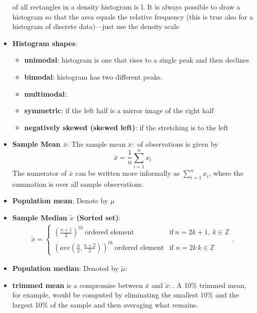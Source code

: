 \documentclass{report}
\begin{document}
\begin{itemize}
            of all rectangles in a density histogram is l. It is always possible to draw a histogram
            so that the area equals the relative frequency (this is true also for a histogram of discrete data)—just use the density scale
        \item \textbf{Histogram shapes}:
            \begin{itemize}
                \item \textbf{unimodal}: histogram is one that rises to a single peak and then declines
                \item \textbf{bimodal}: histogram has two different peaks.
                \item \textbf{multimodal}:.
                \item \textbf{symmetric}: if the left half is a mirror image of the right half
                \item \textbf{negatively skewed (skewed left)}: if the stretching is to the left
            \end{itemize}
        \item \textbf{Sample Mean $\bar{x}$}: The sample mean $\bar{x}:$ of observations is given by
            \[
                \bar{x} = \frac{1}{n} \sum_{i=1}^{n} x_i
            \]
            The numerator of \(\bar{x}\) can be written more informally as \(\sum_{i=1}^{n} x_i\), where the summation is over all sample observations.
        \item \textbf{Population mean}: Denote by $\mu$
        \item \textbf{Sample Median $\tilde{x}$ (Sorted set)}:
            \begin{align*}
                \tilde{x}=
                \begin{cases}
                    \left(\frac{n+1}{2}\right)^{th}\ \text{ordered element} &\text{if}\ n = 2k+1,\ k\in\mathbb{Z}   \\
                    \left(ave\left(\frac{n}{2}, \frac{n+2}{2}\right)\right)^{th}\ \text{ordered element} & \text{if } n=2k\, k\in\mathbb{Z} 
                \end{cases}
                .\end{align*}
        \item \textbf{Population median}: Denoted by $\tilde{\mu}:$
        \item \textbf{trimmed mean} is a compromise between $\bar{x}$ and $\tilde{x}:$. A 10\% trimmed mean, for example, would be computed by eliminating the smallest 10\% and the largest 10\% of the sample and then averaging what remains.

\end{itemize}
\end{document}
